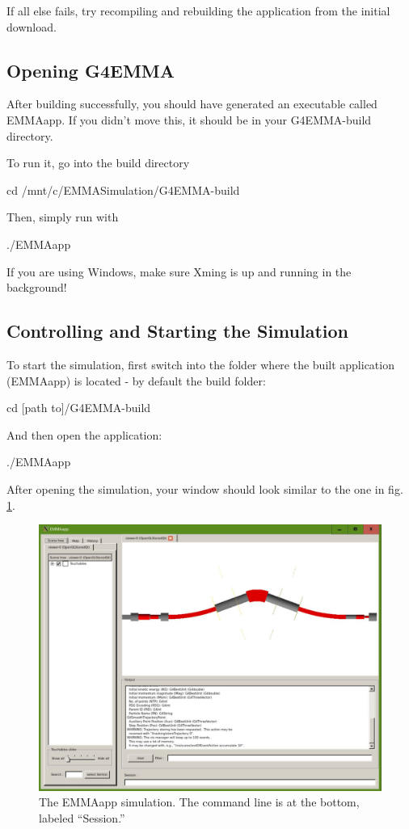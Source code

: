 \documentclass{article}
\newcommand{\filefont}[1]{{\fontfamily{pnc}\selectfont #1}\xspace}
\begin{document}
If all else fails, try recompiling and rebuilding the application from the initial download. 

\subsection{Opening G4EMMA}

After building successfully, you should have generated an executable called \filefont{EMMAapp}. If you didn't move this, it should be in your \filefont{G4EMMA-build} directory. 

To run it, go into the build directory

\filefont{cd /mnt/c/EMMASimulation/G4EMMA-build}

Then, simply run with

\filefont{./EMMAapp}

If you are using Windows, make sure Xming is up and running in the background! 

\subsection{Controlling and Starting the Simulation}

To start the simulation, first switch into the folder where the built application (EMMAapp) is located - by default the build folder: 

\filefont{cd [path to]/G4EMMA-build}

And then open the application: 

\filefont{./EMMAapp}

After opening the simulation, your window should look similar to the one in fig. \ref{EMMAapp}. 

\begin{figure}[h!]
\centering
\includegraphics[scale=0.5]{EMMAapp.JPG} 
\caption{The EMMAapp simulation. The command line is at the bottom, labeled ``Session.''}
\label{EMMAapp}
\end{figure}
\end{document}
